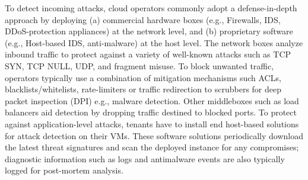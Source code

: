 To detect incoming attacks, cloud operators commonly adopt a
defense-in-depth approach by deploying (a) commercial hardware boxes
(e.g., Firewalls, IDS, DDoS-protection appliances) at the network
level, and (b) proprietary software (e.g., Host-based IDS,
anti-malware) at the host level.
The network boxes analyze inbound traffic to protect against a variety
of well-known attacks such as TCP SYN, TCP NULL, UDP, and fragment
misuse.
To block unwanted traffic, operators typically use a combination of mitigation
mechanisms such ACLs, blacklists/whitelists, rate-limiters or traffic redirection
to scrubbers for deep packet inspection (DPI) e.g., malware detection.  
Other middleboxes such as load balancers 
aid detection by dropping traffic destined to blocked ports. 
To protect against application-level attacks, tenants have to install end host-based solutions
for attack detection on their VMs. %
These software solutions periodically download the latest threat signatures 
and scan the deployed instance for any compromises; diagnostic information such as logs and antimalware events are also typically logged for post-mortem analysis.  


